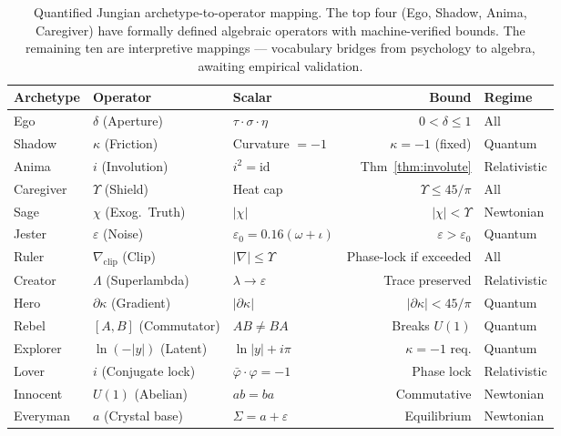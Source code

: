 \begin{table}[H]
\centering
{\small
\begin{tabular}{@{}lllrl@{}}
\toprule
\textbf{Archetype} & \textbf{Operator} & \textbf{Scalar} & \textbf{Bound} & \textbf{Regime} \\
\midrule
Ego        & $\delta$ (Aperture)   & $\tau \cdot \sigma \cdot \eta$ & $0 < \delta \leq 1$ & All \\
Shadow     & $\kappa$ (Friction)   & Curvature $= -1$     & $\kappa = -1$ (fixed) & Quantum \\
Anima      & $i$ (Involution)      & $i^2 = \mathrm{id}$  & Thm~\ref{thm:involute} & Relativistic \\
Caregiver  & $\Upsilon$ (Shield)   & Heat cap  & $\Upsilon \leq 45/\pi$ & All \\
\midrule
Sage       & $\chi$ (Exog.~Truth)  & $|\chi|$ & $|\chi| < \Upsilon$ & Newtonian \\
Jester     & $\varepsilon$ (Noise) & $\varepsilon_0 = 0.16(\omega+\iota)$ & $\varepsilon > \varepsilon_0$ & Quantum \\
Ruler      & $\nabla_{\mathrm{clip}}$ (Clip) & $|\nabla| \leq \Upsilon$ & Phase-lock if exceeded & All \\
Creator    & $\Lambda$ (Superlambda) & $\lambda \to \varepsilon$ & Trace preserved & Relativistic \\
\midrule
Hero       & $\partial\kappa$ (Gradient) & $|\partial\kappa|$ & $|\partial\kappa| < 45/\pi$ & Quantum \\
Rebel      & $[A, B]$ (Commutator) & $AB \neq BA$ & Breaks $U(1)$ & Quantum \\
Explorer   & $\ln(-|y|)$ (Latent)  & $\ln|y| + i\pi$ & $\kappa = -1$ req. & Quantum \\
Lover      & $i$ (Conjugate lock)  & $\bar\varphi \cdot \varphi = -1$ & Phase lock & Relativistic \\
\midrule
Innocent   & $U(1)$ (Abelian)      & $ab = ba$ & Commutative & Newtonian \\
Everyman   & $a$ (Crystal base)    & $\Sigma = a + \varepsilon$ & Equilibrium & Newtonian \\
\bottomrule
\end{tabular}
}
\caption{Quantified Jungian archetype-to-operator mapping. The top four (Ego, Shadow, Anima, Caregiver) have formally defined algebraic operators with machine-verified bounds. The remaining ten are interpretive mappings --- vocabulary bridges from psychology to algebra, awaiting empirical validation.}
\label{tab:jungian}
\end{table}

